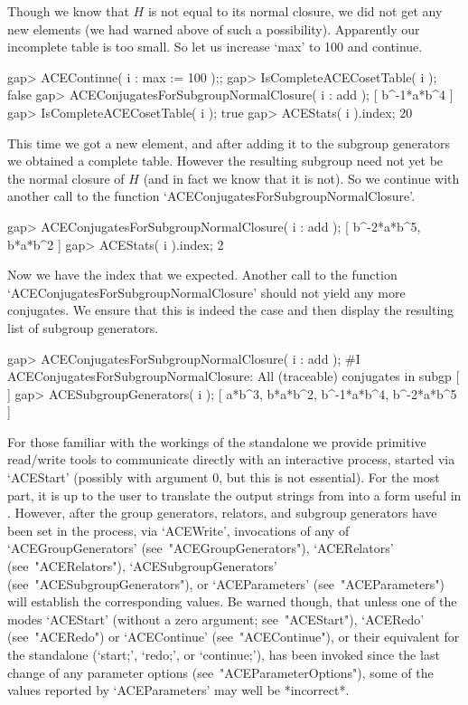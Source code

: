 \endexample

Though we know that $H$ is not equal to its normal closure, we did not
get any new elements (we had warned  above  of  such  a  possibility).
Apparently our incomplete table is too small. So let us increase `max'
to 100 and continue.

\beginexample
gap> ACEContinue( i : max := 100 );;
gap> IsCompleteACECosetTable( i );
false
gap> ACEConjugatesForSubgroupNormalClosure( i : add );
[ b^-1*a*b^4 ]
gap> IsCompleteACECosetTable( i );
true
gap> ACEStats( i ).index;
20

\endexample

This time we got a new element, and after adding it  to  the  subgroup
generators  we  obtained  a  complete  table.  However  the  resulting
subgroup need not yet be the normal closure of $H$  (and  in  fact  we
know that it is not). So we continue with another call to the function
`ACEConjugatesForSubgroupNormalClosure'.

\beginexample
gap> ACEConjugatesForSubgroupNormalClosure( i : add );
[ b^-2*a*b^5, b*a*b^2 ]
gap> ACEStats( i ).index;
2

\endexample

Now we have the index that we expected. Another call to  the  function
`ACEConjugatesForSubgroupNormalClosure'  should  not  yield  any  more
conjugates. We ensure that this is indeed the case  and  then  display
the resulting list of subgroup generators.

\beginexample
gap> ACEConjugatesForSubgroupNormalClosure( i : add );
#I  ACEConjugatesForSubgroupNormalClosure: All (traceable) conjugates in subgp
[  ]
gap> ACESubgroupGenerators( i );
[ a*b^3, b*a*b^2, b^-1*a*b^4, b^-2*a*b^5 ]

\endexample


For those familiar with the  workings  of  the  {\ACE}  standalone  we
provide primitive read/write tools to  communicate  directly  with  an
interactive {\ACE} process,  started  via  `ACEStart'  (possibly  with
argument 0, but this is not essential). For the most part, it is up to
the user to translate the output  strings  from  {\ACE}  into  a  form
useful in {\GAP}. However, after the group generators,  relators,  and
subgroup  generators  have  been  set  in  the  {\ACE}  process,   via
`ACEWrite',    invocations    of    any    of     `ACEGroupGenerators'
(see~"ACEGroupGenerators"),     `ACERelators'     (see~"ACERelators"),
`ACESubgroupGenerators'       (see~"ACESubgroupGenerators"),        or
`ACEParameters' (see~"ACEParameters") will establish the corresponding
{\GAP} values.  Be  warned  though,  that  unless  one  of  the  modes
`ACEStart'  (without  a  zero  argument;  see~"ACEStart"),   `ACERedo'
(see~"ACERedo")  or  `ACEContinue'   (see~"ACEContinue"),   or   their
equivalent  for  the  standalone   {\ACE}   (`start;',   `redo;',   or
`continue;'), has been invoked since the last change of any  parameter
options (see~"ACEParameterOptions"), some of the  values  reported  by
`ACEParameters' may well be *incorrect*.

